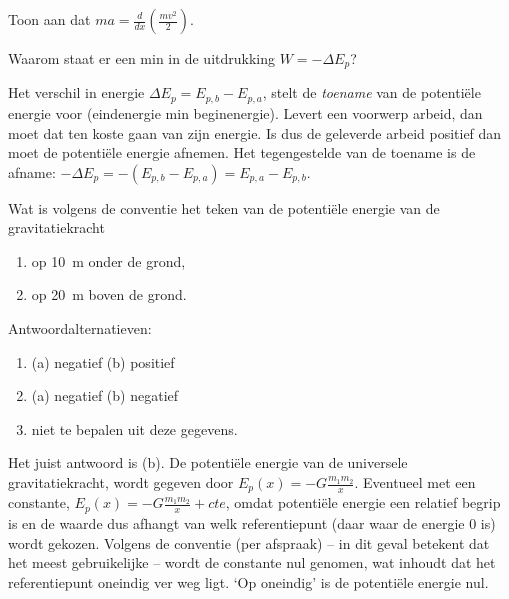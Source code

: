 \documentclass{ximera}
\begin{document}
	\author{Bart Lambregs}
    \xmsource\xmuitleg

\begin{exercise}
	Toon aan dat $ma=\frac{d}{dx}\left(\frac{mv^2}{2}\right)$.
\end{exercise}

\begin{exercise}
	Waarom staat er een min in de uitdrukking $W=-\Delta E_p$?

	\begin{oplossing}
		Het verschil in energie $\Delta E_p=E_{p,b}-E_{p,a}$, stelt de \textit{toename} van de potentiële energie voor (eindenergie min beginenergie). Levert een voorwerp arbeid, dan moet dat ten koste gaan van zijn energie. Is dus de geleverde arbeid positief dan moet de potentiële energie afnemen. Het tegengestelde van de toename is de afname: $-\Delta E_p=-(E_{p,b}-E_{p,a})=E_{p,a}-E_{p,b}$.
	\end{oplossing}
\end{exercise}

\begin{exercise}
	Wat is volgens de conventie het teken van de potentiële energie van de gravitatiekracht
	\begin{enumerate}
		\item op \SI{10}{m} onder de grond,
		\item op \SI{20}{m} boven de grond.
	\end{enumerate}
	Antwoordalternatieven:
	\begin{enumerate}
		\item (a) negatief
		\newline
		(b) positief
		\item (a) negatief
		\newline
		(b) negatief
		\item niet te bepalen uit deze gegevens.
	\end{enumerate}

	\begin{oplossing}
		Het juist antwoord is (b). De potentiële energie van de universele gravitatiekracht, wordt gegeven door $E_p(x)=-G\frac{m_1m_2}{x}$. Eventueel met een constante, $E_p(x)=-G\frac{m_1m_2}{x}+cte$, omdat potentiële energie een relatief begrip is en de waarde dus afhangt van welk referentiepunt (daar waar de energie 0 is) wordt gekozen. Volgens de conventie (per afspraak) -- in dit geval betekent dat het meest gebruikelijke -- wordt de constante nul genomen, wat inhoudt dat het referentiepunt oneindig ver weg ligt. `Op oneindig' is de potentiële energie nul.
	\end{oplossing}
\end{exercise}
\end{document}
